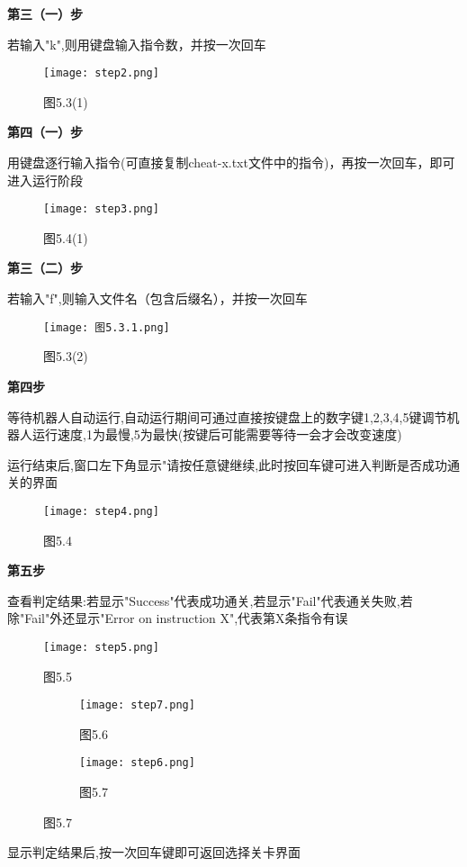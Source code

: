\documentclass{report}
\begin{document}
    \textbf{第三（一）步}\par
    若输入"k",则用键盘输入指令数，并按一次回车
    \begin{figure}[htbp]
        \centering
        \texttt{[image: step2.png]}
        \caption*{图5.3(1)}
    \end{figure}\par
    
    \textbf{第四（一）步}\par
    用键盘逐行输入指令(可直接复制cheat-x.txt文件中的指令)，再按一次回车，即可进入运行阶段\newpage
    \begin{figure}[htbp]
        \centering
        \texttt{[image: step3.png]}
        \caption*{图5.4(1)}
    \end{figure}\par

    \textbf{第三（二）步}\par
    若输入"f",则输入文件名（包含后缀名），并按一次回车
    \begin{figure}[htbp]
        \centering
        \texttt{[image: 图5.3.1.png]}
        \caption*{图5.3(2)}
    \end{figure}\par

    \textbf{第四步}\par
    等待机器人自动运行,自动运行期间可通过直接按键盘上的数字键1,2,3,4,5键调节机器人运行速度,1为最慢,5为最快(按键后可能需要等待一会才会改变速度)\par
    运行结束后,窗口左下角显示"请按任意键继续,此时按回车键可进入判断是否成功通关的界面\newpage
    \begin{figure}[htbp]
        \centering
        \texttt{[image: step4.png]}
        \caption*{图5.4}
    \end{figure}\par

    \textbf{第五步}\par
    查看判定结果:\;若显示"Success"代表成功通关,若显示"Fail"代表通关失败,若除"Fail"外还显示"Error on instruction X",代表第X条指令有误
    \begin{figure}[htbp]
        \centering
        \texttt{[image: step5.png]}
        \caption*{图5.5}
    \end{figure}\par
    \begin{figure}[htbp]
        \centering
        \begin{subfigure}[b]{0.45\textwidth}
            \texttt{[image: step7.png]}
            \caption*{图5.6}
        \end{subfigure}
        \begin{subfigure}[b]{0.45\textwidth}
            \texttt{[image: step6.png]}
            \caption*{图5.7}
        \end{subfigure}
    \end{figure}\par
    显示判定结果后,按一次回车键即可返回选择关卡界面
\end{document}
